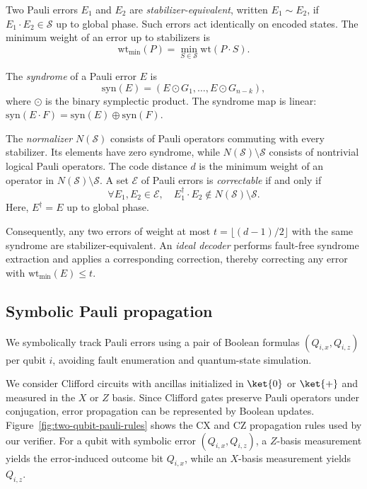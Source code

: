 \documentclass[acmsmall,screen,review,anonymous,nonacm]{acmart}
\begin{document}
Two Pauli errors $E_1$ and $E_2$ are
\emph{stabilizer-equivalent}, written $E_1\sim E_2$,
if $E_1\cdot E_2\in\mathcal{S}$ up to global phase.
Such errors act identically on encoded states.
The minimum weight of an error up to stabilizers is
\begin{equation}
\mathrm{wt}_{\min}(P)
=\min_{S\in\mathcal{S}}\mathrm{wt}(P\cdot S).
\label{eq:wt_min}
\end{equation}

The \emph{syndrome} of a Pauli error $E$ is
\begin{equation}
\mathrm{syn}(E)
=(E\odot G_1,\ldots,E\odot G_{n-k}),
\label{eq:syndrome}
\end{equation}
where $\odot$ is the binary symplectic product.
The syndrome map is linear:
$\mathrm{syn}(E\cdot F)
=\mathrm{syn}(E)\oplus\mathrm{syn}(F)$.

The \emph{normalizer} $N(\mathcal{S})$ consists of
Pauli operators commuting with every stabilizer.
Its elements have zero syndrome, while
$N(\mathcal{S})\setminus\mathcal{S}$ consists of
nontrivial logical Pauli operators.
The code distance $d$ is the minimum weight of
an operator in $N(\mathcal{S})\setminus\mathcal{S}$.
A set $\mathcal{E}$ of Pauli errors is
\emph{correctable} if and only if~\cite{KL97,Got97}
\begin{equation}
\forall E_1,E_2\in\mathcal{E},\quad
E_1^\dagger\cdot E_2
\notin N(\mathcal{S})\setminus\mathcal{S}.
\label{eq:QECC_condition}
\end{equation}
Here, $E^\dagger=E$ up to global phase.

Consequently, any two errors of weight at most
$t=\lfloor(d-1)/2\rfloor$ with the same syndrome
are stabilizer-equivalent.
An \emph{ideal decoder} performs fault-free syndrome
extraction and applies a corresponding correction,
thereby correcting any error with
$\mathrm{wt}_{\min}(E)\le t$.





\subsection{Symbolic Pauli propagation}

We symbolically track Pauli errors using a pair of Boolean
formulas $(Q_{i,x},Q_{i,z})$ per qubit $i$, avoiding
fault enumeration and quantum-state simulation.

We consider Clifford circuits with ancillas initialized
in $\ket{0}$ or $\ket{+}$ and measured in the $X$ or $Z$
basis. Since Clifford gates preserve Pauli operators
under conjugation, error propagation can be represented
by Boolean updates. Figure~\ref{fig:two-qubit-pauli-rules}
shows the CX and CZ propagation rules used by our verifier.
For a qubit with symbolic error $(Q_{i,x},Q_{i,z})$,
a $Z$-basis measurement yields the error-induced outcome
bit $Q_{i,x}$, while an $X$-basis measurement yields
$Q_{i,z}$.
\end{document}
